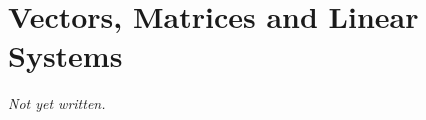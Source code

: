 \chapter{Vectors, Matrices and Linear Systems}\label{ch:vectors-matrices-linear-systems}


\textit{Not yet written.}
